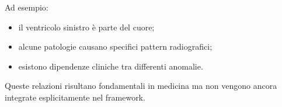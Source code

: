 Ad esempio:

\begin{itemize}
    \item il ventricolo sinistro è parte del cuore;
    \item alcune patologie causano specifici pattern radiografici;
    \item esistono dipendenze cliniche tra differenti anomalie.
\end{itemize}

Queste relazioni risultano fondamentali in medicina ma non vengono ancora integrate esplicitamente nel framework.